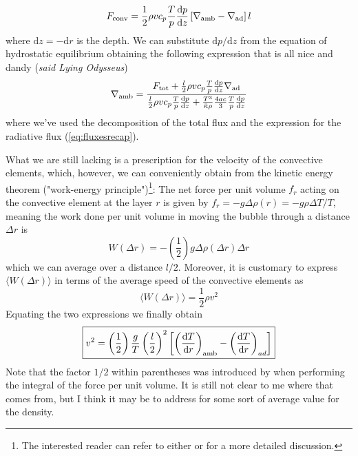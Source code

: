 \begin{equation*}
	F_{\text{conv}} = \frac{1}{2}\rho v c_{p}\frac{T}{p}\frac{\text{d}p}{\text{d}z}\left[\nabla_{\text{amb}}-\nabla_{\text{ad}}\right]l
\end{equation*}
where $\text{d}z = -\text{d}r$ is the depth. We can substitute $\text{d}p/\text{d}z$ from the equation of hydrostatic equilibrium obtaining the following expression that is all nice and dandy (\emph{said Lying Odysseus})
\begin{equation}
	\nabla_{\text{amb}} = \frac{F_{\text{tot}}+\frac{l}{2}\rho v c_{p}\frac{T}{p}\frac{\text{d}p}{\text{d}z}\nabla_{\text{ad}}}{\frac{l}{2}\rho v c_{p}\frac{T}{p}\frac{\text{d}p}{\text{d}z}+\frac{T^{3}}{\bar{\kappa}\rho}\frac{4ac}{3}\frac{T}{p}\frac{\text{d}p}{\text{d}z}}
	\label{eq:convectiveambientgradient}
\end{equation}
where we've used the decomposition of the total flux and the expression for the radiative flux (\ref{eq:fluxesrecap}).
\par What we are still lacking is a prescription for the velocity of the convective elements, which, however, we can conveniently obtain from the kinetic energy theorem ("work-energy principle")\footnote{The interested reader can refer to either \cite{1968pss..book.....C} or \cite{2005essp.book.....S} for a more detailed discussion.}: The net force per unit volume $f_{r}$ acting on the convective element at the layer $r$ is given by $f_{r} = -g\Delta\rho(r) = -g\rho\Delta T/T$, meaning the work done per unit volume in moving the bubble through a distance $\Delta r$ is
\begin{equation*}
	W(\Delta r) = -\left(\frac{1}{2}\right)g\Delta\rho(\Delta r)\Delta r 
\end{equation*}
which we can average over a distance $l/2$. Moreover, it is customary to express $\langle W(\Delta r)\rangle$ in terms of the average speed of the convective elements as 
\begin{equation*}
	\langle W(\Delta r)\rangle = \frac{1}{2}\rho v^{2}
\end{equation*}
Equating the two expressions we finally obtain 
\begin{equation}
	\boxed{
		v^{2} = \left(\frac{1}{2}\right) \frac{g}{T}\left(\frac{l}{2}\right)^{2} \left[\left(\frac{\text{d}T}{\text{d}r}\right)_{\text{amb}}-\left(\frac{\text{d}T}{\text{d}r}\right)_{ad}\right]
	}
	\label{eq:convectivevelocity}
\end{equation}
Note that the factor $1/2$ within parentheses was introduced by \cite{2005essp.book.....S} when performing the integral of the force per unit volume. It is still not clear to me where that comes from, but I think it may be to address for some sort of average value for the density.

